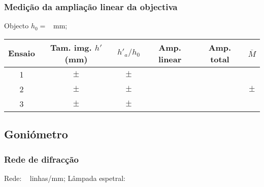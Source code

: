 \documentclass[a4paper,12pt]{article}  %
\begin{document}
\subsubsection{Medição da ampliação linear da objectiva}

Objecto $h_0=$~\underline{\makebox[1cm][r]{~}} mm; \\

\begin{center}
	\begin{tabular}{|c|c|c|c|c|c|}
	\hline
	Ensaio &
	 Tam. img. $h'$ (mm) &  
	 $h'_a/h_0$ &
 	 Amp. linear &
	 Amp. total  &
	 $\overline{M}$ \\
	 
	\hline \hline
	1  & $\pm$ & \quad $\pm$ \quad & \makebox[2cm][r] & & \\ \cline{1-5}
	 2 & $\pm$ & \quad $\pm$ \quad & & & \quad\quad $\pm$ \quad\quad\quad   \\ \cline{1-5}
	 3 & $\pm$ & \quad $\pm$ \quad & & & \\ \hline
	\end{tabular}
\end{center}








\vspace{1 cm}

\subsection{\sf Goniómetro}

\vspace{0.5 cm}
\subsubsection{\sf Rede de difracção}

Rede: ~\underline{\makebox[1cm][r]{~}} linhas/mm;
Lâmpada espetral: ~\underline{\makebox[3cm][r]{~}}

\vspace{1 cm}
\end{document}

